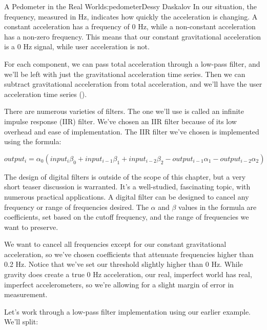 \begin{aosachapter}{A Pedometer in the Real World}{s:pedometer}{Dessy Daskalov}
In our situation, the frequency, measured in Hz, indicates how quickly
the acceleration is changing. A constant acceleration has a frequency of
0 Hz, while a non-constant acceleration has a non-zero frequency. This
means that our constant gravitational acceleration is a 0 Hz signal,
while user acceleration is not.

For each component, we can pass total acceleration through a low-pass
filter, and we'll be left with just the gravitational acceleration time
series. Then we can subtract gravitational acceleration from total
acceleration, and we'll have the user acceleration time series
().


There are numerous varieties of filters. The one we'll use is called an
infinite impulse response (IIR) filter. We've chosen an IIR filter
because of its low overhead and ease of implementation. The IIR filter
we've chosen is implemented using the formula:

\[
output_{i} = \alpha_{0}(input_{i}\beta_{0} + input_{i-1}\beta_{1} + input_{i-2}\beta_{2} - output_{i-1}\alpha_{1} - output_{i-2}\alpha_{2})
\]

The design of digital filters is outside of the scope of this chapter,
but a very short teaser discussion is warranted. It's a well-studied,
fascinating topic, with numerous practical applications. A digital
filter can be designed to cancel any frequency or range of frequencies
desired. The $\alpha$ and $\beta$ values in the formula are
coefficients, set based on the cutoff frequency, and the range of
frequencies we want to preserve.

We want to cancel all frequencies except for our constant gravitational
acceleration, so we've chosen coefficients that attenuate frequencies
higher than 0.2 Hz. Notice that we've set our threshold slightly higher
than 0 Hz. While gravity does create a true 0 Hz acceleration, our real,
imperfect world has real, imperfect accelerometers, so we're allowing
for a slight margin of error in measurement.

\label{implementing-a-low-pass-filter}

Let's work through a low-pass filter implementation using our earlier
example. We'll split:

\begin{aosaitemize}


\end{aosaitemize}
\end{aosachapter}
